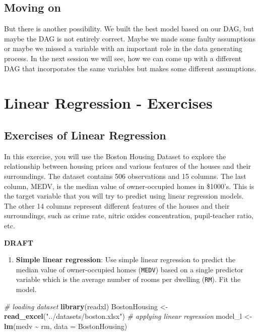 \documentclass[
]{book}
\newenvironment{Shaded}{\begin{snugshade}}{\end{snugshade}}
\newcommand{\AttributeTok}[1]{\textcolor[rgb]{0.13,0.29,0.53}{#1}}
\newcommand{\CommentTok}[1]{\textcolor[rgb]{0.56,0.35,0.01}{\textit{#1}}}
\newcommand{\FunctionTok}[1]{\textcolor[rgb]{0.13,0.29,0.53}{\textbf{#1}}}
\newcommand{\NormalTok}[1]{#1}
\newcommand{\OtherTok}[1]{\textcolor[rgb]{0.56,0.35,0.01}{#1}}
\newcommand{\SpecialCharTok}[1]{\textcolor[rgb]{0.81,0.36,0.00}{\textbf{#1}}}
\newcommand{\StringTok}[1]{\textcolor[rgb]{0.31,0.60,0.02}{#1}}
\providecommand{\tightlist}{%
  \setlength{\itemsep}{0pt}\setlength{\parskip}{0pt}}
\begin{document}
\hypertarget{moving-on-2}{%
\section{Moving on}\label{moving-on-2}}

But there is another possibility. We built the best model based on our DAG, but
maybe the DAG is not entirely correct. Maybe we made some faulty assumptions or
maybe we missed a variable with an important role in the data generating
process. In the next session we will see, how we can come up with a different
DAG that incorporates the same variables but makes some different assumptions.

\hypertarget{lin-e}{%
\chapter{Linear Regression - Exercises}\label{lin-e}}

\hypertarget{exercises-of-linear-regression}{%
\section{Exercises of Linear Regression}\label{exercises-of-linear-regression}}

In this exercise, you will use the Boston Housing Dataset to explore the relationship between housing prices and various features of the houses and their surroundings. The dataset contains 506 observations and 15 columns. The last column, MEDV, is the median value of owner-occupied homes in \$1000's. This is the target variable that you will try to predict using linear regression models. The other 14 columns represent different features of the houses and their surroundings, such as crime rate, nitric oxides concentration, pupil-teacher ratio, etc.

\textbf{DRAFT}

\begin{enumerate}
\def\labelenumi{\arabic{enumi}.}
\tightlist
\item
  \textbf{Simple linear regression}: Use simple linear regression to predict the median value of owner-occupied homes (\texttt{MEDV}) based on a single predictor variable which is the average number of rooms per dwelling (\texttt{RM}). Fit the model.
\end{enumerate}

\begin{Shaded}
\begin{Highlighting}[]
\CommentTok{\# loading dataset}
\FunctionTok{library}\NormalTok{(readxl)}
\NormalTok{BostonHousing }\OtherTok{\textless{}{-}} \FunctionTok{read\_excel}\NormalTok{(}\StringTok{"../datasets/boston.xlsx"}\NormalTok{)}
\CommentTok{\# applying linear regression}
\NormalTok{model\_l }\OtherTok{\textless{}{-}} \FunctionTok{lm}\NormalTok{(medv }\SpecialCharTok{\textasciitilde{}}\NormalTok{ rm, }\AttributeTok{data =}\NormalTok{ BostonHousing)}
\end{Highlighting}
\end{Shaded}
\end{document}

